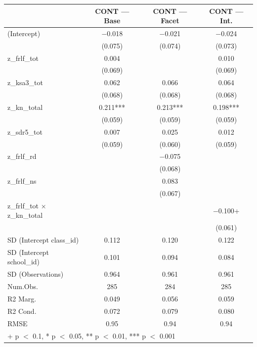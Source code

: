 \documentclass[
  10pt,
]{article}
\begin{document}
\begin{table}
\centering
\begin{tabular}[t]{lccc}
\toprule
  & CONT — Base & CONT — Facet & CONT — Int.\\
\midrule
(Intercept) & \num{-0.018} & \num{-0.021} & \num{-0.024}\\
 & (\num{0.075}) & (\num{0.074}) & (\num{0.073})\\
z\_frlf\_tot & \num{0.004} &  & \num{0.010}\\
 & (\num{0.069}) &  & (\num{0.069})\\
z\_ksa3\_tot & \num{0.062} & \num{0.066} & \num{0.064}\\
 & (\num{0.068}) & (\num{0.068}) & (\num{0.068})\\
z\_kn\_total & \num{0.211}*** & \num{0.213}*** & \num{0.198}***\\
 & (\num{0.059}) & (\num{0.059}) & (\num{0.059})\\
z\_sdr5\_tot & \num{0.007} & \num{0.025} & \num{0.012}\\
 & (\num{0.059}) & (\num{0.060}) & (\num{0.059})\\
z\_frlf\_rd &  & \num{-0.075} & \\
 &  & (\num{0.068}) & \\
z\_frlf\_ns &  & \num{0.083} & \\
 &  & (\num{0.067}) & \\
z\_frlf\_tot × z\_kn\_total &  &  & \num{-0.100}+\\
 &  &  & (\num{0.061})\\
SD (Intercept class\_id) & \num{0.112} & \num{0.120} & \num{0.122}\\
SD (Intercept school\_id) & \num{0.101} & \num{0.094} & \num{0.084}\\
SD (Observations) & \num{0.964} & \num{0.961} & \num{0.961}\\
\midrule
Num.Obs. & \num{285} & \num{284} & \num{285}\\
R2 Marg. & \num{0.049} & \num{0.056} & \num{0.059}\\
R2 Cond. & \num{0.072} & \num{0.079} & \num{0.080}\\
RMSE & \num{0.95} & \num{0.94} & \num{0.94}\\
\bottomrule
\multicolumn{4}{l}{\rule{0pt}{1em}+ p $<$ 0.1, * p $<$ 0.05, ** p $<$ 0.01, *** p $<$ 0.001}\\
\end{tabular}
\end{table}
\end{document}

